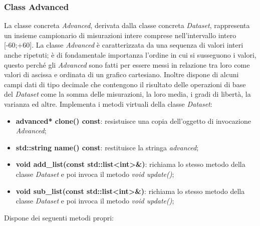 \documentclass[a4paper,10pt]{article}
\begin{document}
    \subsubsection{Class Advanced}
    La classe concreta \textit{Advanced}, derivata dalla classe concreta \textit{Dataset}, rappresenta un insieme campionario di misurazioni intere comprese nell’intervallo intero [-60;+60]. La classe \textit{Advanced} è caratterizzata da una sequenza di valori interi anche ripetuti; è di fondamentale importanza l’ordine in cui si susseguono i valori, questo perché gli \textit{Advanced} sono fatti per essere messi in relazione tra loro come valori di ascissa e ordinata di un grafico cartesiano. Inoltre dispone di alcuni campi dati di tipo decimale che contengono il risultato delle operazioni di base del \textit{Dataset} come la somma delle misurazioni, la loro media, i gradi di libertà, la varianza ed altre.
    Implementa i metodi virtuali della classe \textit{Dataset}:
	\begin{itemize}
        \item \textbf{advanced* clone() const}: resistuisce una copia dell'oggetto di invocazione \textit{Advanced};
		\item \textbf{std::string name() const}: restituisce la stringa \textit{advanced};
		\item \textbf{void add\_list(const std::list<int>\&)}: richiama lo stesso metodo della classe \textit{Dataset} e poi invoca il metodo \textit{void update()};
        \item \textbf{void sub\_list(const std::list<int>\&)}: richiama lo stesso metodo della classe \textit{Dataset} e poi invoca il metodo \textit{void update()};
    \end{itemize}
    Dispone dei seguenti metodi propri:
\end{document}
